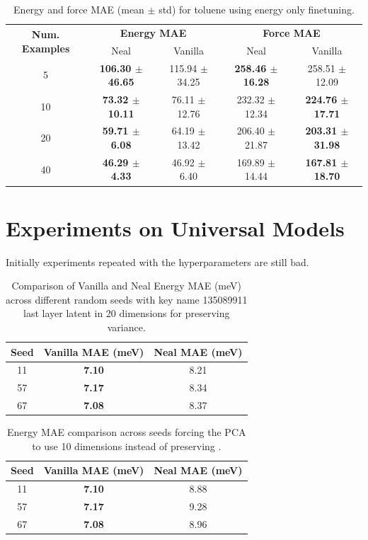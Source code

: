 \documentclass[12pt]{article}
\theoremstyle{definition}
\theoremstyle{remark}
\begin{document}
\begin{table}[ht!]
\centering
\label{tab:toluene_energy_force_mae}
\begin{tabular}{c|cc|cc}
\hline
\multirow{2}{*}{\textbf{Num. Examples}} 
& \multicolumn{2}{c|}{\textbf{Energy MAE}} 
& \multicolumn{2}{c}{\textbf{Force MAE}} \\
& Neal & Vanilla & Neal & Vanilla \\
\hline
5  & \textbf{106.30 $\pm$ 46.65} & 115.94 $\pm$ 34.25
   & \textbf{258.46 $\pm$ 16.28} & 258.51 $\pm$ 12.09 \\

10 & \textbf{73.32 $\pm$ 10.11} & 76.11 $\pm$ 12.76
   & 232.32 $\pm$ 12.34 & \textbf{224.76 $\pm$ 17.71} \\

20 & \textbf{59.71 $\pm$ 6.08} & 64.19 $\pm$ 13.42
   & 206.40 $\pm$ 21.87 & \textbf{203.31 $\pm$ 31.98} \\

40 & \textbf{46.29 $\pm$ 4.33} & 46.92 $\pm$ 6.40
   & 169.89 $\pm$ 14.44 & \textbf{167.81 $\pm$ 18.70} \\
\hline
\end{tabular}
\caption{Energy and force MAE (mean $\pm$ std) for toluene using energy only finetuning.}
\end{table}

\newpage
\section{Experiments on Universal Models}
Initially experiments repeated with the hyperparameters are still bad.
\begin{table}[h]
\centering
\begin{tabular}{ccc}
\hline
Seed & Vanilla MAE (meV) & Neal MAE (meV) \\
\hline
11 & \textbf{7.10} & 8.21 \\
57 & \textbf{7.17} & 8.34 \\
67 & \textbf{7.08} & 8.37 \\
\hline
\end{tabular}
\caption{Comparison of Vanilla and Neal Energy MAE (meV) across different random seeds with key name 135089911 last layer latent in 20 dimensions for preserving variance.}
\label{tab:vanilla_vs_neal_mae}
\end{table}
\begin{table}[h]
\centering
\begin{tabular}{ccc}
\hline
Seed & Vanilla MAE (meV) & Neal MAE (meV) \\
\hline
11 & \textbf{7.10} & 8.88 \\
57 & \textbf{7.17} & 9.28 \\
67 & \textbf{7.08} & 8.96 \\
\hline
\end{tabular}
\caption{Energy MAE comparison across seeds forcing the PCA to use 10 dimensions instead of preserving .}
\end{table}
\end{document}
